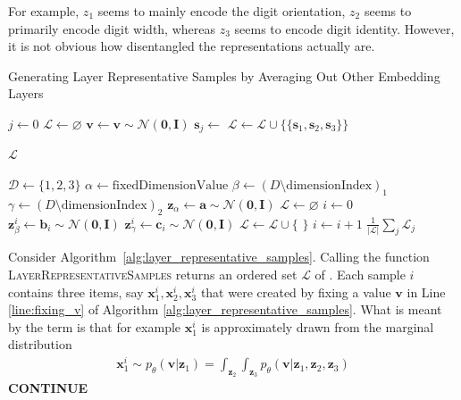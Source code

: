 \documentclass[11pt]{article}
\begin{document}
    For example, $z_1$ seems to mainly encode the digit orientation, $z_2$ seems to primarily encode digit width, whereas $z_3$ seems to encode digit identity.
    However, it is not obvious how disentangled the representations actually are.
    \begin{algorithm}
        \caption{Generating Layer Representative Samples by Averaging Out Other Embedding Layers}\label{alg:layer_representative_samples}
        \begin{algorithmic}[1]
            \State $j \gets 0$
            \State $\mathcal{L}\gets \varnothing$
            \State $\bm{v} \gets \bm{v} \sim \mathcal{N}(\bm{0}, \bm{I})$\label{line:fixing_v}
            \State $\bm{s}_j \gets$ 
            \EndFor
            \State $\mathcal{L} \gets \mathcal{L} \cup \{\{\bm{s}_1, \bm{s}_2, \bm{s}_3\}\}$

            \EndWhile
            \State \Return $\mathcal{L}$
            \EndFunction

            \State $\mathcal{D} \gets \{1,2,3\}$
            \State $\alpha \gets \text{fixedDimensionValue}$
            \State $\beta \gets (D \setminus \text{dimensionIndex})_1$
            \State $\gamma \gets (D \setminus \text{dimensionIndex})_2$
            \State $\bm{z}_{\alpha} \gets \bm{a} \sim \mathcal{N}(\bm{0}, \bm{I})$
            \State $\mathcal{L}\gets \varnothing$
            \State $i \gets 0$
            \State $\bm{z}_{\beta}^i \gets \bm{b}_i \sim \mathcal{N}(\bm{0}, \bm{I})$
            \State $\bm{z}_{\gamma}^i \gets \bm{c}_i \sim \mathcal{N}(\bm{0}, \bm{I})$
            \State $\mathcal{L} \gets \mathcal{L} \cup \{$  $\}$
            \State $i \gets i + 1$
            \EndWhile
            \State \Return $\frac{1}{|\mathcal{L}|}\sum_j \mathcal{L}_j$
            \EndFunction
        \end{algorithmic}
    \end{algorithm}

    Consider Algorithm~\ref{alg:layer_representative_samples}.
    Calling the function \textsc{LayerRepresentativeSamples} returns an ordered set $\mathcal{L}$ of .
    Each sample $i$ contains three items, say $\bm{x}_1^i, \bm{x}_2^i, \bm{x}_3^i$ that were created by fixing a value $\bm{v}$ in Line \ref{line:fixing_v} of Algorithm \ref{alg:layer_representative_samples}.
    What is meant by the term  is that for example $\bm{x}_1^i$ is approximately drawn from the marginal distribution
    \begin{align}
        \bm{x}_1^i \sim p_\theta(\bm{v} | \bm{z}_1) = \int_{\bm{z}_2} \int_{\bm{z}_3} p_\theta(\bm{v} | \bm{z}_1, \bm{z}_2, \bm{z}_3)
    \end{align}
    \textbf{CONTINUE}
\end{document}
